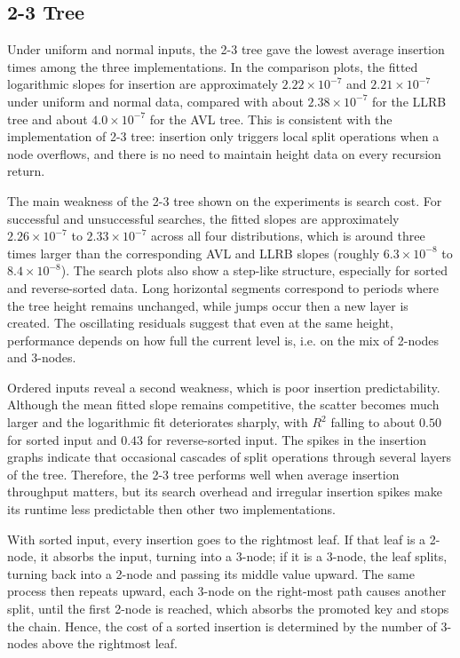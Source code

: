 \documentclass[12pt]{article}
\begin{document}
\subsection{2-3 Tree}
Under uniform and normal inputs, the 2-3 tree gave the lowest average insertion times among the three implementations. In the comparison plots, the fitted logarithmic slopes for insertion are approximately $2.22\times 10^{-7}$ and $2.21 \times 10^{-7}$ under uniform and normal data, compared with about $2.38\times 10^{-7}$ for the LLRB tree and about $4.0\times 10^{-7}$ for the AVL tree. This is consistent with the implementation of 2-3 tree: insertion only triggers local split operations when a node overflows, and there is no need to maintain height data on every recursion return. 

The main weakness of the 2-3 tree shown on the experiments is search cost. For successful and unsuccessful searches, the fitted slopes are approximately $2.26\times 10^{-7}$ to $2.33\times 10^{-7}$ across all four distributions, which is around three times larger than the corresponding AVL and LLRB slopes (roughly $6.3\times 10^{-8}$ to $8.4\times 10^{-8}$). The search plots also show a step-like structure, especially for sorted and reverse-sorted data. Long horizontal segments correspond to periods where the tree height remains unchanged, while jumps occur then a new layer is created. The oscillating residuals suggest that even at the same height, performance depends on how full the current level is, i.e. on the mix of 2-nodes and 3-nodes.

Ordered inputs reveal a second weakness, which is poor insertion predictability. Although the mean fitted slope remains competitive, the scatter becomes much larger and the logarithmic fit deteriorates sharply, with $R^2$ falling to about $0.50$ for sorted input and $0.43$ for reverse-sorted input. The spikes in the insertion graphs indicate that occasional cascades of split operations through several layers of the tree. Therefore, the 2-3 tree performs well when  average insertion throughput matters, but its search overhead and irregular insertion spikes make its runtime less predictable then other two implementations. 

With sorted input, every insertion goes to the rightmost leaf. If that leaf is a 2-node, it absorbs the input, turning into a 3-node; if it is a 3-node, the leaf splits, turning back into a 2-node and passing its middle value upward. The same process then repeats upward, each 3-node on the right-most path causes another split, until the first 2-node is reached, which absorbs the promoted key and stops the chain. Hence, the cost of a sorted insertion is determined by the number of 3-nodes above the rightmost leaf. 
\end{document}
